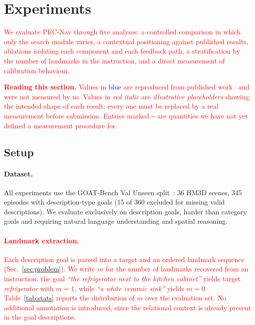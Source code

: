 \section{Experiments}

\textcolor{red}{We evaluate PEC-Nav through five analyses: a controlled comparison in which only the search module varies, a contextual positioning against published results, ablations isolating each component and each feedback path, a stratification by the number of landmarks in the instruction, and a direct measurement of calibration behaviour.}

\newcommand{\plotbox}[1]{%
  \fbox{\parbox[c][#1][c]{0.96\columnwidth}{\centering\textcolor{red}{\textsc{plot placeholder}}}}%
}
\newcommand{\plotboxw}[1]{%
  \fbox{\parbox[c][#1][c]{0.97\textwidth}{\centering\textcolor{red}{\textsc{plot placeholder}}}}%
}
\newcommand{\dm}[1]{\textcolor{red}{\textit{#1}}}

\textcolor{red}{\textbf{Reading this section.} Values in \textcolor{blue}{blue} are reproduced from published work~\cite{wang2026memoryexplorer,khanna2024goatbench} and were not measured by us. Values in \dm{red italic} are \emph{illustrative placeholders} showing the intended shape of each result; every one must be replaced by a real measurement before submission. Entries marked \texttt{--} are quantities we have not yet defined a measurement procedure for.}

\subsection{Setup}

\paragraph{Dataset.} All experiments use the GOAT-Bench Val Unseen split~\cite{khanna2024goatbench}: 36 HM3D scenes, 345 episodes with description-type goals (15 of 360 excluded for missing valid descriptions). We evaluate exclusively on description goals, harder than category goals and requiring natural language understanding and spatial reasoning.

\textcolor{red}{\paragraph{Landmark extraction.} Each description goal is parsed into a target and an ordered landmark sequence (Sec.~\ref{sec:problem}). We write $m$ for the number of landmarks recovered from an instruction: the goal \emph{``the refrigerator next to the kitchen cabinet''} yields target \emph{refrigerator} with $m=1$, while \emph{``a white ceramic sink''} yields $m=0$. Table~\ref{tab:stats} reports the distribution of $m$ over the evaluation set. No additional annotation is introduced, since the relational context is already present in the goal descriptions.}

